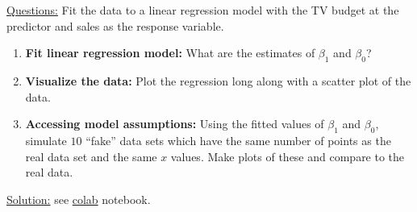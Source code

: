 \begin{itemize}
\begin{example}
 \noindent
\underline{Questions:} Fit the data to a linear regression model with the TV budget at the  predictor and sales as the response variable. 
\begin{enumerate}[label=(\alph*)]
\item {\bf Fit linear regression model:} What are the estimates of $\beta_1$ and $\beta_0$? 
\item {\bf Visualize the data:} Plot the regression long along with a scatter plot of the data. 
\item {\bf Accessing model assumptions:} Using the fitted values of $\beta_1$ and $\beta_0$, simulate $10$ ``fake'' data sets which have the same number of points as the real data set and the same $x$ values.  Make plots of these and compare to the real data.  \\
\end{enumerate}

 \noindent
\underline{Solution:} see \href{https://colab.research.google.com/drive/1_4zOruAWfJ3HQoIf9sjefk3z0APko94-?usp=sharing}{colab} notebook. 
\end{example}




\end{itemize}
